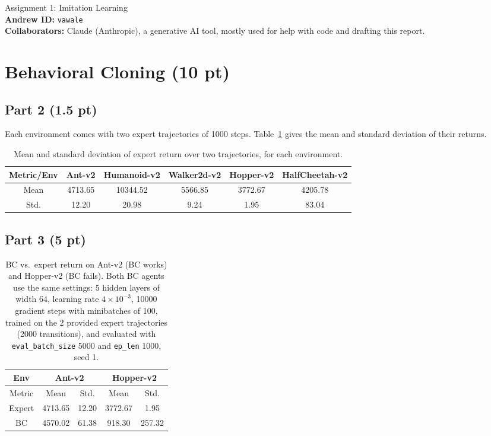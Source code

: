 \documentclass{article}
\begin{document}
\begin{center}
    {\Large Assignment 1: Imitation Learning} \\
    \vspace{.25cm}
    \textbf{Andrew ID:} \texttt{vawale} \\
    \textbf{Collaborators:} Claude (Anthropic), a generative AI tool, mostly used for help with
    code and drafting this report.
\end{center}

\section{Behavioral Cloning (10 pt)}

\subsection{Part 2 (1.5 pt)}

Each environment comes with two expert trajectories of 1000 steps. Table~\ref{tab:p2}
gives the mean and standard deviation of their returns.

\begin{table}[!h]
  \centering
  \caption{Mean and standard deviation of expert return over two trajectories, for each environment.}
  \begin{tabular}{cccccc}
    \toprule
    Metric/Env & Ant-v2 & Humanoid-v2 & Walker2d-v2 & Hopper-v2 & HalfCheetah-v2 \\
    \midrule
    Mean  & 4713.65 & 10344.52 & 5566.85 & 3772.67 & 4205.78 \\
    Std.  & 12.20 & 20.98 & 9.24 & 1.95 & 83.04 \\
    \bottomrule
  \end{tabular}
  \label{tab:p2}
\end{table}

\subsection{Part 3 (5 pt)}

\begin{table}[!h]
  \centering
  \caption{BC vs.\ expert return on Ant-v2 (BC works) and Hopper-v2 (BC fails). Both BC
  agents use the same settings: 5 hidden layers of width 64, learning rate
  $4\times10^{-3}$, 10000 gradient steps with minibatches of 100, trained on the 2 provided
  expert trajectories (2000 transitions), and evaluated with \texttt{eval\_batch\_size} 5000
  and \texttt{ep\_len} 1000, seed 1.}
  \begin{tabular}{ccccc}
    \toprule
    Env   & \multicolumn{2}{c}{Ant-v2} & \multicolumn{2}{c}{Hopper-v2} \\
    \midrule
    Metric & Mean  & Std.  & Mean  & Std. \\
    Expert & 4713.65 & 12.20 & 3772.67 & 1.95 \\
    BC    & 4570.02 & 61.38 & 918.30 & 257.32 \\
    \bottomrule
  \end{tabular}
  \label{tab:p3}
\end{table}
\end{document}
